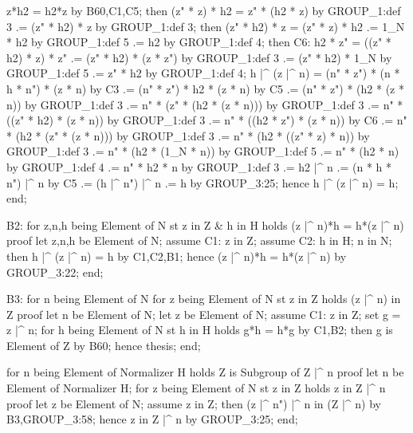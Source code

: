       z*h2 = h2*z by B60,C1,C5;
      then (z" * z) * h2 = z" * (h2 * z) by GROUP_1:def 3
                        .= (z" * h2) * z by GROUP_1:def 3;
      then (z" * h2) * z = (z" * z) * h2
                        .= 1_N * h2 by GROUP_1:def 5
                        .= h2 by GROUP_1:def 4;
      then C6: h2 * z" = ((z" * h2) * z) * z"
                      .= (z" * h2) * (z * z") by GROUP_1:def 3
                      .= (z" * h2) * 1_N by GROUP_1:def 5
                      .= z" * h2 by GROUP_1:def 4;
      h |^ (z |^ n) = (n" * z") * (n * h * n") * (z * n) by C3
                   .= (n" * z") * h2 * (z * n) by C5
                   .= (n" * z") * (h2 * (z * n)) by GROUP_1:def 3
                   .= n" * (z" * (h2 * (z * n))) by GROUP_1:def 3
                   .= n" * ((z" * h2) * (z * n)) by GROUP_1:def 3
                   .= n" * ((h2 * z") * (z * n)) by C6
                   .= n" * (h2 * (z" * (z * n))) by GROUP_1:def 3
                   .= n" * (h2 * ((z" * z) * n)) by GROUP_1:def 3
                   .= n" * (h2 * (1_N * n)) by GROUP_1:def 5
                   .= n" * (h2 * n) by GROUP_1:def 4
                   .= n" * h2 * n by GROUP_1:def 3
                   .= h2 |^ n
                   .= (n * h * n") |^ n by C5
                   .= (h |^ n") |^ n
                   .= h by GROUP_3:25;
      hence h |^ (z |^ n) = h;
    end;


    B2: for z,n,h being Element of N
    st z in Z & h in H
    holds (z |^ n)*h = h*(z |^ n)
    proof
      let z,n,h be Element of N;
      assume C1: z in Z;
      assume C2: h in H;
      n in N;
      then h |^ (z |^ n) = h by C1,C2,B1;
      hence (z |^ n)*h = h*(z |^ n) by GROUP_3:22;
    end;


    B3: for n being Element of N
    for z being Element of N st z in Z holds (z |^ n) in Z
    proof
      let n be Element of N;
      let z be Element of N;
      assume C1: z in Z;
      set g = z |^ n;
      for h being Element of N st h in H holds g*h = h*g by C1,B2;
      then g is Element of Z by B60;
      hence thesis;
    end;

    for n being Element of Normalizer H
    holds Z is Subgroup of Z |^ n
    proof
      let n be Element of Normalizer H;
      for z being Element of N st z in Z holds z in Z |^ n
      proof
        let z be Element of N;
        assume z in Z;
        then (z |^ n") |^ n in (Z |^ n) by B3,GROUP_3:58;
        hence z in Z |^ n by GROUP_3:25;
      end;


